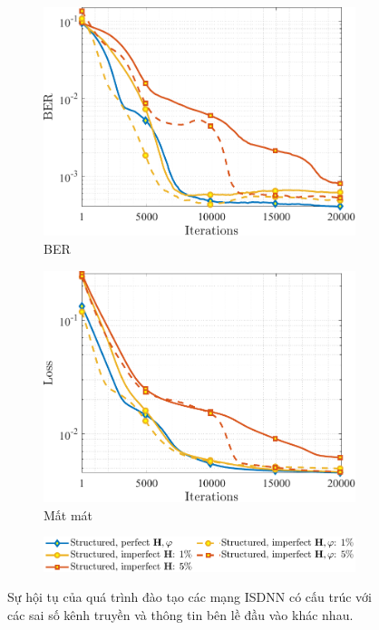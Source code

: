 \begin{figure}[ht]
     \centering
     \begin{subfigure}[b]{0.48\textwidth}
         \centering
         \includegraphics[width=\textwidth]{figures/BER_3.pdf}
         \caption{BER}
         \label{fig:ber_3}
     \end{subfigure}
     \hfill
     \begin{subfigure}[b]{0.48\textwidth}
         \centering
         \includegraphics[width=\textwidth]{figures/Loss_3.pdf}
         \caption{Mất mát}
         \label{fig:loss_3}
     \end{subfigure}
     \hfill
    \begin{subfigure}{\linewidth}
        \centering
        \includegraphics[width=.8\linewidth]{figures/lg_performance_31.pdf}
    \end{subfigure}
    \caption{Sự hội tụ của quá trình đào tạo các mạng ISDNN có cấu trúc với các sai số kênh truyền và thông tin bên lề đầu vào khác nhau.}
    \label{fig:training_3}
\end{figure}

